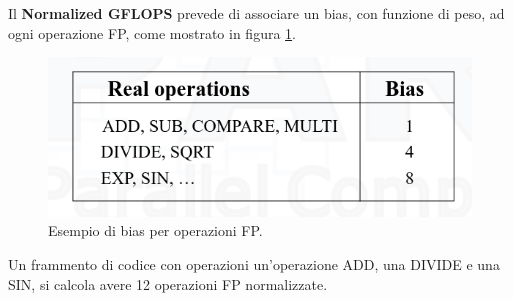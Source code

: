 Il \textbf{Normalized GFLOPS} prevede di associare un bias, con funzione di peso, ad ogni operazione FP, come mostrato in figura \ref{fig:normalized-gflops}.
\begin{figure}[th]
	\centering
	\includegraphics[width=0.7\linewidth]{img/normalized-gflops.png}
	\caption{Esempio di bias per operazioni FP.}
	\label{fig:normalized-gflops}
\end{figure}

Un frammento di codice con operazioni un'operazione ADD, una DIVIDE e una SIN, si calcola avere 12 operazioni FP normalizzate.
















